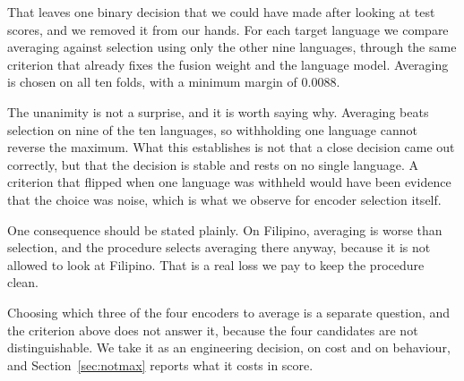 That leaves one binary decision that we could have made after looking at
test scores, and we removed it from our hands. For each target language
we compare averaging against selection using only the other nine
languages, through the same criterion that already fixes the fusion
weight and the language model. Averaging is chosen on all ten folds,
with a minimum margin of $0.0088$.

The unanimity is not a surprise, and it is worth saying why. Averaging
beats selection on nine of the ten languages, so withholding one
language cannot reverse the maximum. What this establishes is not that a
close decision came out correctly, but that the decision is stable and
rests on no single language. A criterion that flipped when one language
was withheld would have been evidence that the choice was noise, which
is what we observe for encoder selection itself.

One consequence should be stated plainly. On Filipino, averaging is
worse than selection, and the procedure selects averaging there anyway,
because it is not allowed to look at Filipino. That is a real loss we
pay to keep the procedure clean.

Choosing which three of the four encoders to average is a separate
question, and the criterion above does not answer it, because the four
candidates are not distinguishable. We take it as an engineering
decision, on cost and on behaviour, and Section~\ref{sec:notmax} reports
what it costs in score.

%
%

